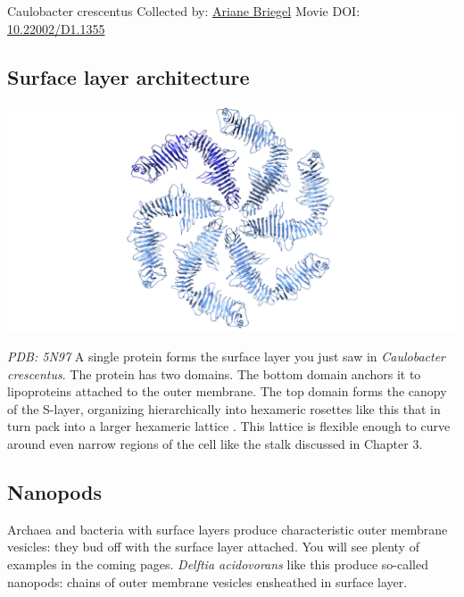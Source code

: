 \documentclass[]{tufte-book}
\begin{document}
\hypertarget{htmlwidget-d333ded89036425184f9}{}

\label{fig:2-6}Caulobacter crescentus Collected by: \protect\hyperlink{ariane_briegel}{Ariane Briegel} Movie DOI: \href{https://doi.org/10.22002/D1.1355}{10.22002/D1.1355}

\hypertarget{Surface_layer_architecture}{%
\subsection{Surface layer architecture}\label{Surface_layer_architecture}}

\includegraphics{img/schematics/2_6_1}

\emph{PDB: 5N97}
A single protein forms the surface layer you just saw in \emph{Caulobacter crescentus}. The protein has two domains. The bottom domain anchors it to lipoproteins attached to the outer membrane. The top domain forms the canopy of the S-layer, organizing hierarchically into hexameric rosettes like this that in turn pack into a larger hexameric lattice \citep{bharat2017}. This lattice is flexible enough to curve around even narrow regions of the cell like the stalk discussed in Chapter 3.

\hypertarget{Nanopods}{%
\subsection{Nanopods}\label{Nanopods}}

Archaea and bacteria with surface layers produce characteristic outer membrane vesicles: they bud off with the surface layer attached. You will see plenty of examples in the coming pages. \emph{Delftia acidovorans} like this produce so-called nanopods: chains of outer membrane vesicles ensheathed in surface layer.



\hypertarget{htmlwidget-01a099c0809ebbe263d4}{}
\end{document}
